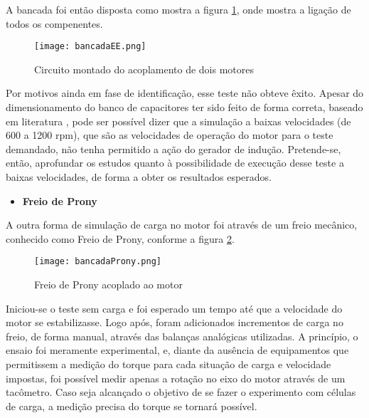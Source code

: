 			A bancada foi então disposta como mostra a figura \ref{bancadaEE}, onde mostra a ligação de todos os compenentes.

			\begin{figure}[!h]
				\centering
				\texttt{[image: bancadaEE.png]}
				\caption[Circuito montado do acoplamento de dois motores]{Circuito montado do acoplamento de dois motores} 
				\label{bancadaEE}
			\end{figure}

			Por motivos ainda em fase de identificação, esse teste não obteve êxito. Apesar do dimensionamento do banco de capacitores ter sido feito de forma correta, baseado em literatura \cite{Vanco}, pode ser possível dizer que a simulação a baixas velocidades (de 600 a 1200 rpm), que são as velocidades de operação do motor para o teste demandado, não tenha permitido a ação do gerador de indução. Pretende-se, então, aprofundar os estudos quanto à possibilidade de execução desse teste a baixas velocidades, de forma a obter os resultados esperados.

		\begin{itemize}
		\item \textbf{Freio de Prony}
		\end{itemize}

			A outra forma de simulação de carga no motor foi através de um freio mecânico, conhecido como Freio de Prony, conforme a figura \ref{bancadaProny}.

			\begin{figure}[!h]
				\centering
				\texttt{[image: bancadaProny.png]}
				\caption[Freio de Prony acoplado ao motor]{Freio de Prony acoplado ao motor} 
				\label{bancadaProny}
			\end{figure}

			Iniciou-se o teste sem carga e foi esperado um tempo até que a velocidade do motor se estabilizasse. Logo após, foram adicionados incrementos de carga no freio, de forma manual, através das balanças analógicas utilizadas. A princípio, o ensaio foi meramente experimental, e, diante da ausência de equipamentos que permitissem a medição do torque para cada situação de carga e velocidade impostas, foi possível medir apenas a rotação no eixo do motor através de um tacômetro. Caso seja alcançado o objetivo de se fazer o experimento com células de carga, a medição precisa do torque se tornará possível.

